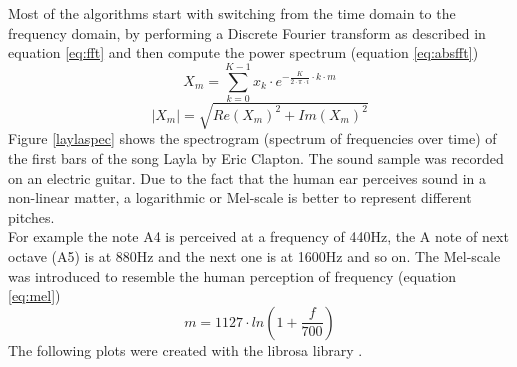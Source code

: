 Most of the algorithms start with switching from the time domain to the frequency domain, by performing a Discrete Fourier transform as described in equation \ref{eq:fft} and then compute the power spectrum (equation \ref{eq:absfft}) 
\begin{equation} \label{eq:fft}
X_m = \sum_{k=0}^{K-1}{x_k \cdot e^ { - \frac{K}{ 2 \cdot \pi \cdot i}\cdot k\cdot m}}
\end{equation}
\begin{equation} \label{eq:absfft}
|X_m| = \sqrt{Re(X_m)^2 + Im(X_m)^2}
\end{equation}
Figure \ref{laylaspec} shows the spectrogram (spectrum of frequencies over time) of the first bars of the song Layla by Eric Clapton. The sound sample was recorded on an electric guitar. Due to the fact that the human ear perceives sound in a non-linear matter, a logarithmic or Mel-scale is better to represent different pitches.\\ 
For example the note A4 is perceived at a frequency of 440Hz, the A note of next octave (A5) is at 880Hz and the next one is at 1600Hz and so on. 
The Mel-scale \cite[pp. 53f]{knees1} was introduced to resemble the human perception of frequency (equation \ref{eq:mel})
\begin{equation} \label{eq:mel}
m = 1127 \cdot ln(1 + \frac{f}{700})
\end{equation}
The following plots were created with the librosa library \cite{librosa1}.
